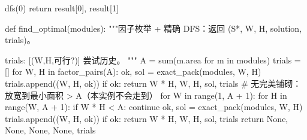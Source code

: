 \documentclass{JXUSTmodeling}
\begin{document}
\begin{appendixx}
\begin{python}
    dfs(0)
    return result[0], result[1]


def find_optimal(modules):
    """因子枚举 + 精确 DFS：返回 (S*, W, H, solution, trials)。

    trials: [(W,H,可行?)] 尝试历史。
    """
    A = sum(m.area for m in modules)
    trials = []
    for W, H in factor_pairs(A):
        ok, sol = exact_pack(modules, W, H)
        trials.append((W, H, ok))
        if ok:
            return W * H, W, H, sol, trials
    # 无完美铺砌：放宽到最小面积 > A（本实例不会走到）
    for W in range(1, A + 1):
        for H in range(W, A + 1):
            if W * H < A:
                continue
            ok, sol = exact_pack(modules, W, H)
            trials.append((W, H, ok))
            if ok:
                return W * H, W, H, sol, trials
    return None, None, None, None, trials
  \end{python}
\end{appendixx}
\end{document}

